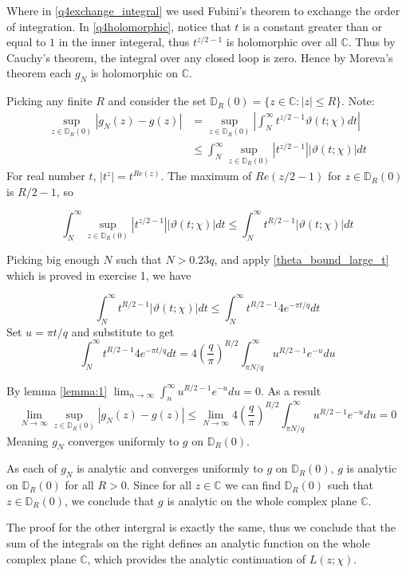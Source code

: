 \documentclass{article}
\theoremstyle{definition}
\theoremstyle{definition}
\theoremstyle{remark}
\newcommand{\D}{\mathbb{D}_R(0)}
\newcommand{\bb}[1]{\mathbb{#1}} %
\begin{document}
Where in \eqref{q4exchange_integral} we used Fubini's theorem to exchange the order of integration. 
In \eqref{q4holomorphic}, notice that $t$ is a constant greater than or equal to $1$ in the inner integeral, thus $t^{z/2 - 1}$ is holomorphic over all $\bb{C}$. 
Thus by Cauchy's theorem, the integral over any closed loop is zero.
Hence by Moreva's theorem each $g_N$ is holomorphic on $\mathbb{C}$.

Picking any finite $R$ and consider the set $\D = \{z \in \bb{C}: |z| \leq R\}$.
Note:
\begin{align}
	\sup_{z \in \D} |g_N(z) - g(z)|
	& = \sup_{z \in \D} \left| \int_{N}^{\infty} t^{z/2-1}\vartheta(t;\chi) dt \right| \\
	&\leq \int_{N}^{\infty} \sup_{z \in \D} \left| t^{z/2-1} \right| |\vartheta(t;\chi) | dt 
\end{align}
For real number $t$, $|t^z| = t^{Re(z)}$. The maximum of $Re(z/2 -1)$ for $z \in \D$ is $R/2 - 1$, so 

$$
	\int_{N}^{\infty} \sup_{z \in \D} \left| t^{z/2-1} \right| |\vartheta(t;\chi) | dt 
	\leq
	\int_{N}^{\infty} t^{R/2-1}  |\vartheta(t;\chi) | dt 
$$

Picking big enough $N$ such that $N > 0.23q$, and apply \eqref{theta_bound_large_t} which is proved in exercise 1, we have

$$
	\int_{N}^{\infty} t^{R/2-1}  |\vartheta(t;\chi) | dt 
	\leq
	\int_{N}^{\infty} t^{R/2-1}  4e^{-\pi t /q} dt 
$$
Set $u = \pi t / q$ and substitute to get 
$$
	\int_{N}^{\infty} t^{R/2-1}  4e^{-\pi t /q} dt 
	= 4 \left(\frac{q}{\pi}\right)^{R/2}\int^{\infty}_{\pi N / q} u^{R/2-1} e^{-u} du
$$

By lemma \ref{lemma:1} $\lim_{n \rightarrow \infty}\int^{\infty}_{n} u^{R/2-1} e^{-u} du = 0 $. 
As a result
$$
\lim_{N \rightarrow  \infty }\sup_{z \in \D} |g_N(z) - g(z)| \leq \lim_{N \rightarrow \infty} 4 \left(\frac{q}{\pi}\right)^{R/2}\int^{\infty}_{\pi N / q} u^{R/2-1} e^{-u} du  = 0 
$$
Meaning $g_N$ converges uniformly to $g$ on $\D$.

As each of $g_N$ is analytic and converges uniformly to $g$ on $\D$, $g$ is analytic on $\D$ for all $R > 0$.
Since for all $z \in \bb{C}$ we can find $\D$ such that $z \in \D$, we conclude that $g$ is analytic on the whole complex plane $\bb{C}$.

The proof for the other intergral is exactly the same, thus we conclude that the sum of the integrals on the right defines an analytic function on the whole complex plane $\mathbb{C}$, which provides the analytic continuation of $L(z;\chi)$.
\end{document}
